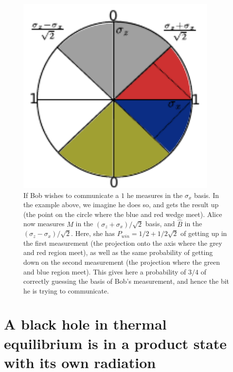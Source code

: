 \documentclass[11pt,a4paper]{article}
\begin{document}
\begin{figure}
\includegraphics[width=10cm]{chsh.pdf}
	\caption{If Bob wishes to communicate a $1$ he measures in the $\sigma_x$ basis. In the example above, we imagine he does so, and gets the result up (the point on the circle where the blue and red wedge meet). Alice now measures $M$ in the $(\sigma_z+\sigma_x)/\sqrt{2}$ basis, and ${\hat B}$ in the $(\sigma_z-\sigma_x)/\sqrt{2}$. Here, she has $P_{win}=1/2+1/2\sqrt{2}$ of getting up in the first measurement (the projection onto the axis where the grey and red region meet), as well as the same probability of getting down on the second measurement (the projection where the green and blue region meet). This gives here a probability of $3/4$ of correctly guessing the basis of Bob's measurement, and hence the bit he is trying to communicate.
	}
\label{fig:chsh}
\end{figure}



%

\appendix

\section{A black hole in thermal equilibrium is in a product state with its own radiation}
\label{sec:product}
\end{document}
